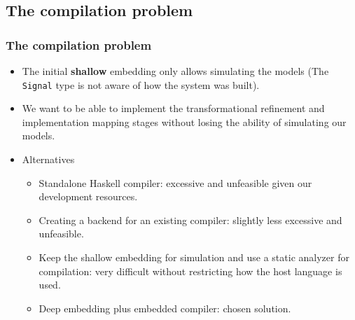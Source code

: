 \documentclass{beamer}
\begin{document}
\subsection{The compilation problem}
\begin{frame}
  \frametitle{The compilation problem}
  
  \begin{itemize}
  \item The initial \textbf{shallow} embedding only allows simulating
    the models (The \texttt{Signal} type is not aware of how
    the system was built).
  \item We want to be able to implement the transformational
    refinement and implementation mapping stages without
    losing the ability of simulating our models.
  \item Alternatives
    \begin{itemize}
    \item Standalone Haskell compiler: excessive and unfeasible given
      our development resources.
    \item Creating a backend for an existing compiler: slightly less excessive and
      unfeasible.
    \item Keep the shallow embedding for simulation and use a static
      analyzer for compilation: very difficult without restricting how the
      host language is used.
    \item Deep embedding plus embedded compiler: chosen solution.
    \end{itemize}
  \end{itemize}
\end{frame}
\end{document}
